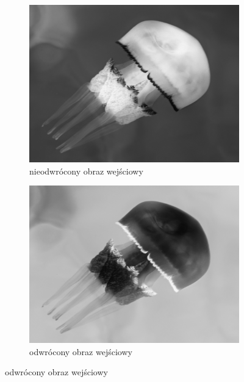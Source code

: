         \begin{figure}[H] 
        \centering
        \begin{subfigure}{0.31\textwidth}
            \centering
            \includegraphics[width = \textwidth]{img/2-theory/10-jellyfish.png}
            \caption{nieodwrócony obraz wejściowy}
            \label{theory-technics-contrast-jellyfish-a}
        \end{subfigure}
        \begin{subfigure}{0.31\textwidth}
            \centering
            \includegraphics[width = \textwidth]{img/2-theory/10-inv-jellyfish.png}
            \caption{odwrócony obraz wejściowy}
            \label{theory-technics-contrast-jellyfish-b}

\end{subfigure}
\end{figure}
